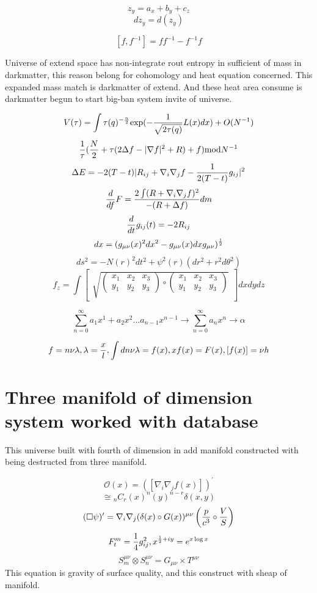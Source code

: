 \documentclass{jsarticle}
\begin{document}
   $$ z_y = a_x + b_y + c_z $$
$$ dz_y = d(z_y) $$

$$ [f, f^{-1}] = ff^{-1} - f^{-1}f $$

  Universe of extend space has non-integrate rout entropy in sufficient of mass in darkmatter,
this reason belong for cohomology and heat equation concerned. This expanded mass match is darkmatter
of extend. And these heat area consume is darkmatter begun to start big-ban system invite of universe.

$$ V(\tau) = \int \tau(q)^{-{n \over 2}} \mathrm{exp}(-{1 \over \sqrt{2 \tau(q)}}L(x)dx) + O(N^{-1}) $$
$$ {1 \over \tau}({N \over 2} + \tau(2 \Delta f - |\nabla f|^2 + R) + f)\mathrm{mod}N^{-1} $$
	$$ \Delta E = -2(T - t)|R_{ij} + \nabla_{i} \nabla_{j} f - {1 \over 2(T - t)}g_{ij}|^2 $$
	$$ {d \over df}F = {2\int (R + \nabla_{i} \nabla_{j} f)^2 \over - (R + \Delta f)}dm $$
	$$ {d \over dt}g_{ij}(t) = - 2 R_{ij} $$
	$$ dx = (g_{\mu\nu}(x)^2dx^2 - g_{\mu\nu}(x)dxg_{\mu\nu})^{1 \over 2} $$
	$$ ds^2 = - N(r)^2dt^2 + \psi^2(r)(dr^2 + r^2d\theta^2) $$
  $$ f_{z} = \int \begin{bmatrix} \sqrt{\begin{pmatrix} x_{1} & x_{2} & x_{3} \\
     y_{1} & y_{2} & y_{3} \end{pmatrix}
     \circ
   \begin{pmatrix} x_{1} & x_{2} & x_{3} \\
     y_{1} & y_{2} & y_{3} \end{pmatrix}}_{}
     \end{bmatrix}dxdydz $$

     $$ \sum^{\infty}_{n=0}a_1x^1 + a_2x^2 \dots a_{n-1}x^{n-1} \to \sum^{\infty}_{n=0} a_nx^n \to \alpha $$

$$ f = n\nu\lambda , \lambda = {x \over l},
 \int dn \nu \lambda = f(x), 
 xf(x) = F(x),
 [f(x)] = \nu h$$

\section{Three manifold of dimension system worked with database}
  This universe built with fourth of dimension in add manifold constructed with being destructed from three manifold.

$$ \mathcal{O}(x) = \left( [\nabla_{i}\nabla_{j}f(x)]\right)^{'} $$
$$  \cong {}_{n}C_{r}(x)^{n}(y)^{n-r} \delta(x,y) $$
$$ (\square \psi)' = \nabla_{i}\nabla_{j}(\delta(x) \circ G(x))^{\mu\nu} \left({p \over c^3} \circ 
{V \over S} \right) $$
$$ F^m_t = {1 \over 4}g^{2}_{ij}, x^{{1 \over 2} + iy} = e^{x \log x} $$
$$ S^{\mu\nu}_m \otimes S^{\mu\nu}_n = G_{\mu\nu} \times T^{\mu\nu} $$
This equation is gravity of surface quality, and this construct with sheap of manifold.
\end{document}

